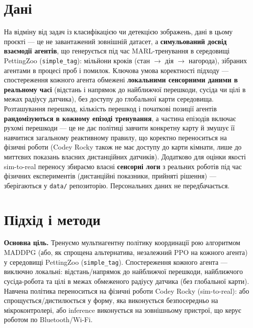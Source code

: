 \documentclass[ukrainian]{ucuproposal}
\begin{document}
\section{Дані}
На відміну від задач із класифікацією чи детекцією зображень, дані в цьому проєкті — це не завантажений зовнішній датасет, а \textbf{симульований досвід взаємодії агентів}, що генерується під час MARL-тренування в середовищі PettingZoo (\texttt{simple\_tag}): мільйони кроків (стан $\rightarrow$ дія $\rightarrow$ нагорода), зібраних агентами в процесі проб і помилок. Ключова умова коректності підходу — спостереження кожного агента обмежені \textbf{локальними сенсорними даними в реальному часі} (відстань і напрямок до найближчої перешкоди, сусіда чи цілі в межах радіусу датчика), без доступу до глобальної карти середовища. Розташування перешкод, кількість перешкод і початкові позиції агентів \textbf{рандомізуються в кожному епізоді тренування}, а частина епізодів включає рухомі перешкоди — це не дає політиці завчити конкретну карту й змушує її навчитися загальному реактивному правилу, що коректно переноситься на фізичні роботи (Codey Rocky також не має доступу до карти кімнати, лише до миттєвих показань власних дистанційних датчиків). Додатково для оцінки якості sim-to-real переносу збираємо власні \textbf{сенсорні логи} з реальних роботів під час фізичних експериментів (дистанційні показники, прийняті рішення) — зберігаються у \texttt{data/} репозиторію. Персональних даних не передбачається.

\section{Підхід і методи}
\textbf{Основна ціль.} Тренуємо мультиагентну політику координації рою алгоритмом MADDPG (або, як спрощена альтернатива, незалежний PPO на кожного агента) у середовищі PettingZoo (\texttt{simple\_tag}). Спостереження кожного агента — виключно локальні: відстань/напрямок до найближчої перешкоди, найближчого сусіда-робота та цілі в межах обмеженого радіусу датчика (без глобальної карти). Навчена політика переноситься на фізичні роботи Codey Rocky (sim-to-real): або спрощується/дистилюється у форму, яка виконується безпосередньо на мікроконтролері, або inference виконується на зовнішньому пристрої, що керує роботом по Bluetooth/Wi-Fi.
\end{document}
